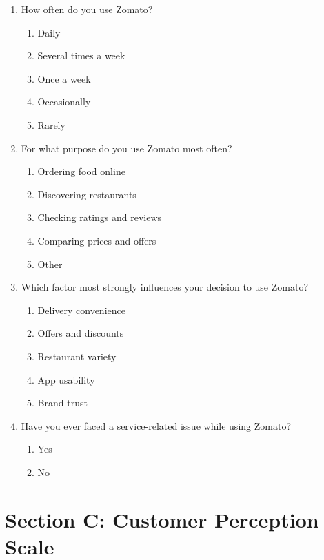\begin{enumerate}[resume,label=\textbf{Q\arabic*.}]
    \item How often do you use Zomato?
    \begin{enumerate}[label=\alph*.]
        \item Daily
        \item Several times a week
        \item Once a week
        \item Occasionally
        \item Rarely
    \end{enumerate}

    \item For what purpose do you use Zomato most often?
    \begin{enumerate}[label=\alph*.]
        \item Ordering food online
        \item Discovering restaurants
        \item Checking ratings and reviews
        \item Comparing prices and offers
        \item Other
    \end{enumerate}

    \item Which factor most strongly influences your decision to use Zomato?
    \begin{enumerate}[label=\alph*.]
        \item Delivery convenience
        \item Offers and discounts
        \item Restaurant variety
        \item App usability
        \item Brand trust
    \end{enumerate}

    \item Have you ever faced a service-related issue while using Zomato?
    \begin{enumerate}[label=\alph*.]
        \item Yes
        \item No
    \end{enumerate}
\end{enumerate}

\section*{Section C: Customer Perception Scale}

